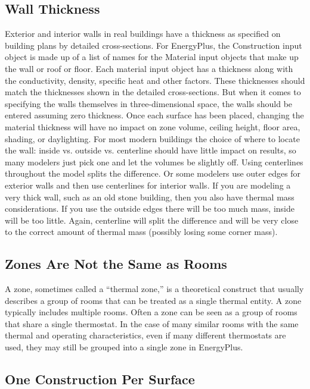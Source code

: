 \subsection*{Wall Thickness}

Exterior and interior walls in real buildings have a thickness as
specified on building plans by detailed cross-sections. For EnergyPlus,
the Construction input object is made up of a list of names for the
Material input objects that make up the wall or roof or floor. Each
material input object has a thickness along with the conductivity,
density, specific heat and other factors. These thicknesses should
match the thicknesses shown in the detailed cross-sections. But when
it comes to specifying the walls themselves in three-dimensional space,
the walls should be entered assuming zero thickness. Once each surface
has been placed, changing the material thickness will have no impact
on zone volume, ceiling height, floor area, shading, or daylighting.
For most modern buildings the choice of where to locate the wall:
inside vs. outside vs. centerline should have little impact on results,
so many modelers just pick one and let the volumes be slightly off.
Using centerlines throughout the model splits the difference. Or some
modelers use outer edges for exterior walls and then use centerlines
for interior walls. If you are modeling a very thick wall, such as
an old stone building, then you also have thermal mass considerations.
If you use the outside edges there will be too much mass, inside will
be too little. Again, centerline will split the difference and will
be very close to the correct amount of thermal mass (possibly losing
some corner mass).

\subsection*{Zones Are Not the Same as Rooms}

A zone, sometimes called a ``thermal zone,'' is a theoretical construct
that usually describes a group of rooms that can be treated as a single
thermal entity. A zone typically includes multiple rooms. Often a
zone can be seen as a group of rooms that share a single thermostat.
In the case of many similar rooms with the same thermal and operating
characteristics, even if many different thermostats are used, they
may still be grouped into a single zone in EnergyPlus.

\subsection*{One Construction Per Surface}

